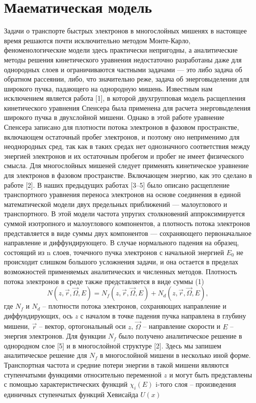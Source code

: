 \chapter{Маематическая модель}
Задачи о транспорте быстрых электронов в многослойных мишенях в настоящее
время решаются почти исключительно методом Монте-Карло, феноменологические
модели здесь практически непригодны, а аналитические методы решения кинетического
уравнения недостаточно разработаны даже для однородных слоев и ограничиваются
частными задачами — это либо задача об обратном рассеянии, либо, что значительно
реже, задача об энерговыделении для широкого пучка, падающего на однородную
мишень. Известным нам исключением является работа [1], в которой двухгрупповая
модель расщепления кинетического уравнения Спенсера была применена для расчета
энерговыделения широкого пучка в двухслойной мишени. Однако в этой работе
уравнение Спенсера записано для плотности потока электронов в фазовом пространстве,
включающем остаточный пробег электронов, и поэтому оно неприменимо для
неоднородных сред, так как в таких средах нет однозначного соответствия между
энергией электронов и их остаточным пробегом и пробег не имеет физического смысла.
Для многослойных мишеней следует применять кинетическое уравнение для электронов в
фазовом пространстве. Включающем энергию, как это сделано в работе [2].
В наших предыдущих работах [3–5] было описано расщепление транспортного
уравнения переноса электронов на основе соединения в единой математической модели
двух предельных приближений — малоуглового и транспортного. В этой модели частота
упругих столкновений аппроксимируется суммой изотропного и малоуглового
компонентов, а плотность потока электронов представляется в виде суммы двух
компонентов — сохраняющего первоначальное направление и диффундирующего.
В случае нормального падения на образец, состоящий из n слоев, точечного пучка
электронов с начальной энергией $E_0$ не происходит слишком большого усложнения
задачи, и она остается в пределах возможностей применяемых аналитических и
численных методов. Плотность потока электронов в среде также представляется в виде
суммы
(1)
\begin{equation}
N(z,\vec{r},\vec{\Omega},E)=N_f (z,\vec{r},\vec{\Omega},E)+N_d (z,\vec{r},\vec{\Omega},E),
\label{eq:}
\end{equation}
где $N_f$ и $N_d$ – плотности потока электронов, сохраняющих направление и
диффундирующих, ось $z$ с началом в точке падения пучка направлена в глубину мишени,
$\vec{r}$ – вектор, ортогональный оси $z$, $\vec{\Omega}$ – направление скорости и $E$ – энергия электронов.
Для функции $N_f$ было получено аналитическое решение в однородном слое [5] и в
многослойной структуре [2]. Здесь мы запишем аналитическое решение для $N_f$ в
многослойной мишени в несколько иной форме. Транспортная частота и средние потери
энергии в такой мишени являются ступенчатыми функциями относительно переменной $z$
и могут быть представлены с помощью характеристических функций $\chi_i(E)$ i-того слоя –
произведения единичных ступенчатых функций Хевисайда $U(x)$



